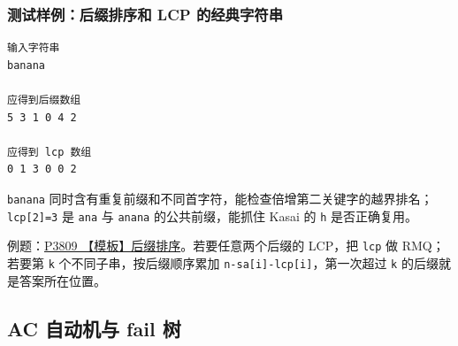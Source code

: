 \subsubsection{测试样例：后缀排序和 LCP 的经典字符串}

\begin{lstlisting}
输入字符串
banana

应得到后缀数组
5 3 1 0 4 2

应得到 lcp 数组
0 1 3 0 0 2
\end{lstlisting}

\passthrough{\lstinline!banana!} 同时含有重复前缀和不同首字符，能检查倍增第二关键字的越界排名；\passthrough{\lstinline!lcp[2]=3!} 是 \passthrough{\lstinline!ana!} 与 \passthrough{\lstinline!anana!} 的公共前缀，能抓住 Kasai 的 \passthrough{\lstinline!h!} 是否正确复用。

例题：\href{https://www.luogu.com.cn/problem/P3809}{P3809 【模板】后缀排序}。若要任意两个后缀的 LCP，把 \passthrough{\lstinline!lcp!} 做 RMQ；若要第 \passthrough{\lstinline!k!} 个不同子串，按后缀顺序累加 \passthrough{\lstinline!n-sa[i]-lcp[i]!}，第一次超过 \passthrough{\lstinline!k!} 的后缀就是答案所在位置。


\subsection{AC 自动机与 fail 树}

